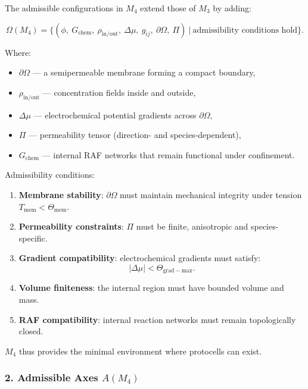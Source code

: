 The admissible configurations in $M_4$ extend those of $M_3$ by adding:

\[
\Omega(M_4)
=
\Big\{
(\phi,\ G_{\mathrm{chem}},\ \rho_{\mathrm{in/out}},\ 
\Delta\mu,\ g_{ij},\ \partial\Omega,\ \Pi)
\ \Big|\ \text{admissibility conditions hold}
\Big\}.
\]

Where:

\begin{itemize}
    \item $\partial\Omega$ — a semipermeable membrane forming a compact boundary,
    \item $\rho_{\mathrm{in/out}}$ — concentration fields inside and outside,
    \item $\Delta\mu$ — electrochemical potential gradients across $\partial\Omega$,
    \item $\Pi$ — permeability tensor (direction- and species-dependent),
    \item $G_{\mathrm{chem}}$ — internal RAF networks that remain functional
          under confinement.
\end{itemize}

Admissibility conditions:

\begin{enumerate}
    \item \textbf{Membrane stability}:  
    $\partial\Omega$ must maintain mechanical integrity under tension 
    $T_{\mathrm{mem}} < \Theta_{\mathrm{mem}}$.

    \item \textbf{Permeability constraints}:  
    $\Pi$ must be finite, anisotropic and species-specific.

    \item \textbf{Gradient compatibility}:  
    electrochemical gradients must satisfy:
    \[
    |\Delta\mu| < \Theta_{\mathrm{grad-max}}.
    \]

    \item \textbf{Volume finiteness}:  
    the internal region must have bounded volume and mass.

    \item \textbf{RAF compatibility}:  
    internal reaction networks must remain topologically closed.
\end{enumerate}

$M_4$ thus provides the minimal environment where protocells can exist.

\subsubsection*{2. Admissible Axes \texorpdfstring{$A(M_4)$}{A(M_4)}}


